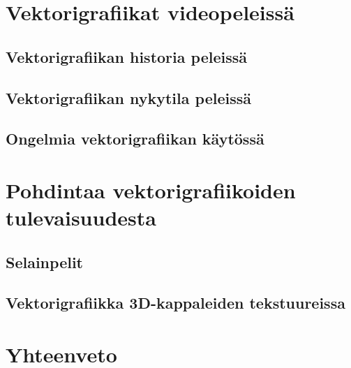 \documentclass[utf8,bachelor]{gradu3}
\begin{document}

\chapter{Vektorigrafiikat videopeleissä}

\section{Vektorigrafiikan historia peleissä}


\section{Vektorigrafiikan nykytila peleissä}


\section{Ongelmia vektorigrafiikan käytössä}


\chapter{Pohdintaa vektorigrafiikoiden tulevaisuudesta}

\section{Selainpelit}


\section{Vektorigrafiikka 3D-kappaleiden tekstuureissa}


\chapter{Yhteenveto}


\printbibliography
\end{document}
